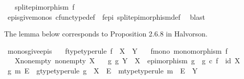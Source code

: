 \begin{isabellebody}
\ \ \ {\isachardoublequoteopen}split{\isacharunderscore}{\kern0pt}epimorphism\ f{\isachardoublequoteclose}\isanewline
%
\isadelimproof
\ \ %
\endisadelimproof
%
\isatagproof
{}\isamarkupfalse%
\ epis{\isacharunderscore}{\kern0pt}give{\isacharunderscore}{\kern0pt}monos\ cfunc{\isacharunderscore}{\kern0pt}type{\isacharunderscore}{\kern0pt}def\ \ f{\isacharunderscore}{\kern0pt}epi\ split{\isacharunderscore}{\kern0pt}epimorphism{\isacharunderscore}{\kern0pt}def\ \isamarkupfalse%
\ blast%
\endisatagproof
{\isafoldproof}%
%
\isadelimproof
%
\endisadelimproof
%
\begin{isamarkuptext}%
The lemma below corresponds to Proposition 2.6.8 in Halvorson.%
\end{isamarkuptext}\isamarkuptrue%
\isamarkupfalse%
\ monos{\isacharunderscore}{\kern0pt}give{\isacharunderscore}{\kern0pt}epis{\isacharcolon}{\kern0pt}\isanewline
\ \ \ f{\isacharunderscore}{\kern0pt}type{\isacharbrackleft}{\kern0pt}type{\isacharunderscore}{\kern0pt}rule{\isacharbrackright}{\kern0pt}{\isacharcolon}{\kern0pt}\ {\isachardoublequoteopen}f\ {\isacharcolon}{\kern0pt}\ X\ {\isasymrightarrow}\ Y{\isachardoublequoteclose}\isanewline
\ \ \ f{\isacharunderscore}{\kern0pt}mono{\isacharcolon}{\kern0pt}\ {\isachardoublequoteopen}monomorphism\ f{\isachardoublequoteclose}\isanewline
\ \ \ X{\isacharunderscore}{\kern0pt}nonempty{\isacharcolon}{\kern0pt}\ {\isachardoublequoteopen}nonempty\ X{\isachardoublequoteclose}\isanewline
\ \ \ {\isachardoublequoteopen}{\isasymexists}g{\isachardot}{\kern0pt}\ g{\isacharcolon}{\kern0pt}\ Y\ {\isasymrightarrow}\ X\ {\isasymand}\ epimorphism\ g\ {\isasymand}\ g\ {\isasymcirc}\isactrlsub c\ f\ {\isacharequal}{\kern0pt}\ id\ X{\isachardoublequoteclose}\isanewline
%
\isadelimproof
%
\endisadelimproof
%
\isatagproof
{}\isamarkupfalse%
\ {\isacharminus}{\kern0pt}\isanewline
\ \ \isamarkupfalse%
\ g\ m\ E\ \ g{\isacharunderscore}{\kern0pt}type{\isacharbrackleft}{\kern0pt}type{\isacharunderscore}{\kern0pt}rule{\isacharbrackright}{\kern0pt}{\isacharcolon}{\kern0pt}\ {\isachardoublequoteopen}g\ {\isacharcolon}{\kern0pt}\ X\ {\isasymrightarrow}\ E{\isachardoublequoteclose}\ \ m{\isacharunderscore}{\kern0pt}type{\isacharbrackleft}{\kern0pt}type{\isacharunderscore}{\kern0pt}rule{\isacharbrackright}{\kern0pt}{\isacharcolon}{\kern0pt}\ {\isachardoublequoteopen}m\ {\isacharcolon}{\kern0pt}\ E\ {\isasymrightarrow}\ Y{\isachardoublequoteclose}\ \isanewline

\end{isabellebody}
